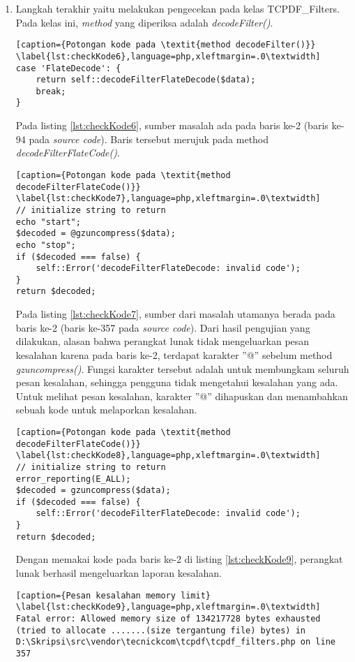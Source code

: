 \begin{enumerate}
	\item Langkah terakhir yaitu melakukan pengecekan pada kelas TCPDF\_Filters. Pada kelas ini, \textit{method} yang diperiksa adalah \textit{decodeFilter()}.
	
\begin{lstlisting}[caption={Potongan kode pada \textit{method decodeFilter()}}	\label{lst:checkKode6},language=php,xleftmargin=.0\textwidth]
case 'FlateDecode': {
	return self::decodeFilterFlateDecode($data);
	break;
}
\end{lstlisting}
	
	Pada listing \ref{lst:checkKode6}, sumber masalah ada pada baris ke-2 (baris ke-94 pada \textit{source code}). Baris tersebut merujuk pada method \textit{decodeFilterFlateCode()}.
	
\begin{lstlisting}[caption={Potongan kode pada \textit{method decodeFilterFlateCode()}}	\label{lst:checkKode7},language=php,xleftmargin=.0\textwidth]
// initialize string to return
echo "start";
$decoded = @gzuncompress($data);
echo "stop";
if ($decoded === false) {
	self::Error('decodeFilterFlateDecode: invalid code');
}
return $decoded;
\end{lstlisting}

	Pada listing \ref{lst:checkKode7}, sumber dari masalah utamanya berada pada baris ke-2 (baris ke-357 pada \textit{source code}). Dari hasil pengujian yang dilakukan, alasan bahwa perangkat lunak tidak mengeluarkan pesan kesalahan karena pada baris ke-2, terdapat karakter ''@'' sebelum method \textit{gzuncompress()}. Fungsi karakter tersebut adalah untuk membungkam seluruh pesan kesalahan, sehingga pengguna tidak mengetahui kesalahan yang ada. Untuk melihat pesan kesalahan, karakter ''@'' dihapuskan dan menambahkan sebuah kode untuk melaporkan kesalahan.
	
\begin{lstlisting}[caption={Potongan kode pada \textit{method decodeFilterFlateCode()}}	\label{lst:checkKode8},language=php,xleftmargin=.0\textwidth]
// initialize string to return
error_reporting(E_ALL);
$decoded = gzuncompress($data);
if ($decoded === false) {
	self::Error('decodeFilterFlateDecode: invalid code');
}
return $decoded;
\end{lstlisting}

	Dengan memakai kode pada baris ke-2 di listing \ref{lst:checkKode9}, perangkat lunak berhasil mengeluarkan laporan kesalahan.
	
\begin{lstlisting}[caption={Pesan kesalahan memory limit}	\label{lst:checkKode9},language=php,xleftmargin=.0\textwidth]
Fatal error: Allowed memory size of 134217728 bytes exhausted (tried to allocate .......(size tergantung file) bytes) in D:\Skripsi\src\vendor\tecnickcom\tcpdf\tcpdf_filters.php on line 357
\end{lstlisting}
	

\end{enumerate}
